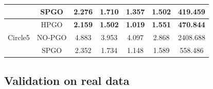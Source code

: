 \documentclass[letterpaper, 10 pt, conference]{ieeeconf}  %
\begin{document}
\begin{table}[]
{\begin{tabular}{|c|c|ccccc|}
                               & SPGO                    & \multicolumn{1}{c|}{2.276}  & \multicolumn{1}{c|}{1.710}  & \multicolumn{1}{c|}{1.357}  & \multicolumn{1}{c|}{1.502}  & 419.459  \\ \hline\hline
    \multirow{3}{*}{Circle5}   & HPGO                    & \multicolumn{1}{c|}{\textbf{2.159}}  & \multicolumn{1}{c|}{\textbf{1.502}}  & \multicolumn{1}{c|}{\textbf{1.019}}  & \multicolumn{1}{c|}{\textbf{1.551}}  & \textbf{470.844}  \\ \cline{2-7} 
                               & NO-PGO                  & \multicolumn{1}{c|}{4.883}  & \multicolumn{1}{c|}{3.953}  & \multicolumn{1}{c|}{4.097}  & \multicolumn{1}{c|}{2.868}  & 2408.688 \\ \cline{2-7} 
                               & SPGO                    & \multicolumn{1}{c|}{2.352}  & \multicolumn{1}{c|}{1.734}  & \multicolumn{1}{c|}{1.148}  & \multicolumn{1}{c|}{1.589}  & 558.486  \\ \hline
    \end{tabular}}
    \label{table:ateSimulation}
    \end{table}


\subsection{Validation on real data}
\end{document}
